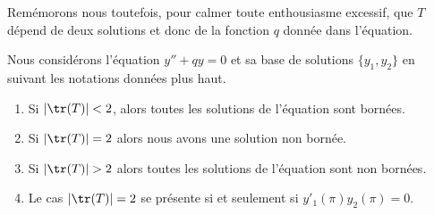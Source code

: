 Remémorons nous toutefois, pour calmer toute enthousiasme excessif, que \( T\) dépend de deux solutions et donc de la fonction \( q\) donnée dans l'équation.

\begin{proposition} \label{PropGJCZcjR}
    Nous considérons l'équation \( y''+qy=0\) et sa base de solutions \( \{ y_1,y_2 \}\) en suivant les notations données plus haut.
    \begin{enumerate}
        \item
            Si \( | \tr(T) |<2\), alors toutes les solutions de l'équation sont bornées.
        \item
            Si \( | \tr(T) |=2\) alors nous avons une solution non bornée.
        \item
            Si \( |\tr(T)|>2\) alors toutes les solutions de l'équation sont non bornées.
        \item
            Le cas \( | \tr(T) |=2\) se présente si et seulement si \( y'_1(\pi)y_2(\pi)=0\).
    \end{enumerate}
\end{proposition}


